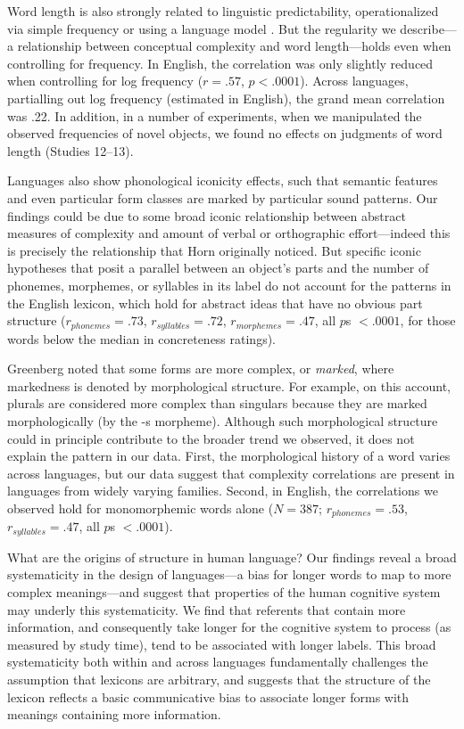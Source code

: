 \documentclass[12pt]{article}
\begin{document}
Word length is also strongly related to linguistic predictability, operationalized via simple frequency \cite{zipf1936} or using a language model \cite{piantadosi2011a}. But the regularity we describe---a relationship between conceptual complexity and word length---holds even when controlling for frequency. In English, the correlation was only slightly reduced when controlling for log frequency ($r = .57$, $p < .0001$). Across languages, partialling out log frequency (estimated in English), the grand mean correlation was .22. In addition, in a number of experiments, when we manipulated the observed frequencies of novel objects, we found no effects on judgments of word length (Studies 12--13). 

Languages also show phonological iconicity effects, such that semantic features \cite{maurer2006shape} and even particular form classes \cite{farmer2006phonological} are marked by particular sound patterns. Our findings could be due to some broad iconic relationship between abstract measures of complexity and amount of verbal or orthographic effort---indeed this is precisely the relationship that Horn originally noticed. But specific iconic hypotheses that posit a parallel between an object's parts and the number of phonemes, morphemes, or syllables in its label do not account for the patterns in the English lexicon, which hold for abstract ideas that have no obvious part structure ($r_{phonemes}  = .73$, $r_{syllables} = .72$, $r_{morphemes} = .47$, all $p$s $< .0001$, for those words below the median in concreteness ratings). 

Greenberg\cite{greenberg1966} noted that some forms are more complex, or \emph{marked}, where markedness is denoted by morphological structure. For example, on this account, plurals are considered more complex than singulars because they are marked morphologically (by the -s morpheme). Although such morphological structure could in principle contribute to the broader trend we observed, it does not explain the pattern in our data. First, the morphological history of a word varies across languages, but our data suggest that complexity correlations are present in languages from widely varying families. Second, in English, the correlations we observed hold for monomorphemic words alone ($N = 387$; $r_{phonemes} = .53$, $r_{syllables} = .47$, all $p$s $< .0001$).

What are the origins of structure in human language? Our findings reveal a broad systematicity in the design of  languages---a bias for longer words to map to more complex meanings---and suggest that properties of the human cognitive system may underly this systematicity. We find that referents that contain more information, and consequently take longer for the cognitive system to process (as measured by study time), tend to be associated with longer labels. This broad systematicity both within and across languages fundamentally challenges the assumption that lexicons are arbitrary, and suggests that the structure of the lexicon reflects a basic communicative bias to associate longer forms with meanings containing more information.
\end{document}
